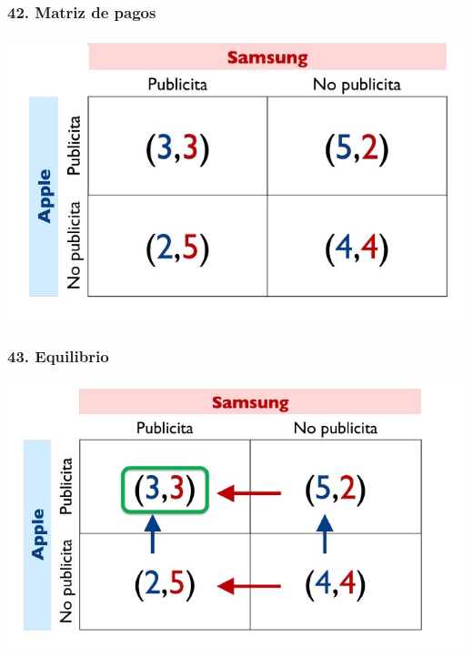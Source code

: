 \documentclass[14pt]{beamer}
\begin{document}
\begin{frame}
\frametitle{42. Matriz de pagos}
\centering
\includegraphics[scale=0.6]{Figures/Tema_03_20_bala.jpg}
\end{frame}

\begin{frame}
\frametitle{43. Equilibrio}
\centering
\includegraphics[scale=0.6]{Figures/Tema_03_21_bala.jpg}
\end{frame}
\end{document}
